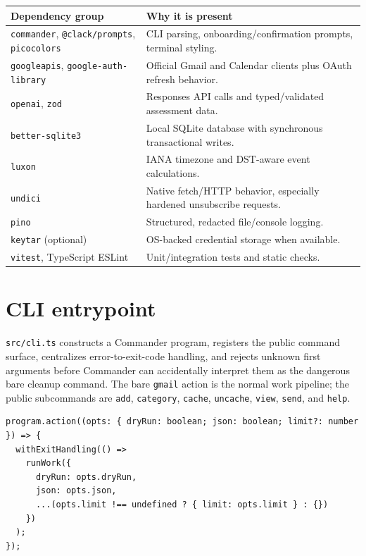 \documentclass[12pt,oneside]{book}
\newcommand{\code}[1]{\nolinkurl{#1}}
\newcommand{\file}[1]{\nolinkurl{#1}}
\newcommand{\term}[1]{\texttt{#1}}
\begin{document}
\begin{center}
\begingroup\small
\begin{tabularx}{\textwidth}{P{3.5cm}Y}
\toprule
\textbf{Dependency group} & \textbf{Why it is present} \\
\midrule
\code{commander}, \code{@clack/prompts}, \code{picocolors} & CLI parsing, onboarding/confirmation prompts, terminal styling. \\
\code{googleapis}, \code{google-auth-library} & Official Gmail and Calendar clients plus OAuth refresh behavior. \\
\code{openai}, \code{zod} & Responses API calls and typed/validated assessment data. \\
\code{better-sqlite3} & Local SQLite database with synchronous transactional writes. \\
\code{luxon} & IANA timezone and DST-aware event calculations. \\
\code{undici} & Native fetch/HTTP behavior, especially hardened unsubscribe requests. \\
\code{pino} & Structured, redacted file/console logging. \\
\code{keytar} (optional) & OS-backed credential storage when available. \\
\code{vitest}, TypeScript ESLint & Unit/integration tests and static checks. \\
\bottomrule
\end{tabularx}
\endgroup
\end{center}

\section{CLI entrypoint}

\file{src/cli.ts} constructs a Commander program, registers the public command surface, centralizes error-to-exit-code handling, and rejects unknown first arguments before Commander can accidentally interpret them as the dangerous bare cleanup command. The bare \term{gmail} action is the normal work pipeline; the public subcommands are \term{add}, \term{category}, \term{cache}, \term{uncache}, \term{view}, \term{send}, and \term{help}.

\begin{lstlisting}[caption={The root command delegates to the work pipeline.},label={lst:cli-root}]
program.action((opts: { dryRun: boolean; json: boolean; limit?: number }) => {
  withExitHandling(() =>
    runWork({
      dryRun: opts.dryRun,
      json: opts.json,
      ...(opts.limit !== undefined ? { limit: opts.limit } : {})
    })
  );
});
\end{lstlisting}
\end{document}
